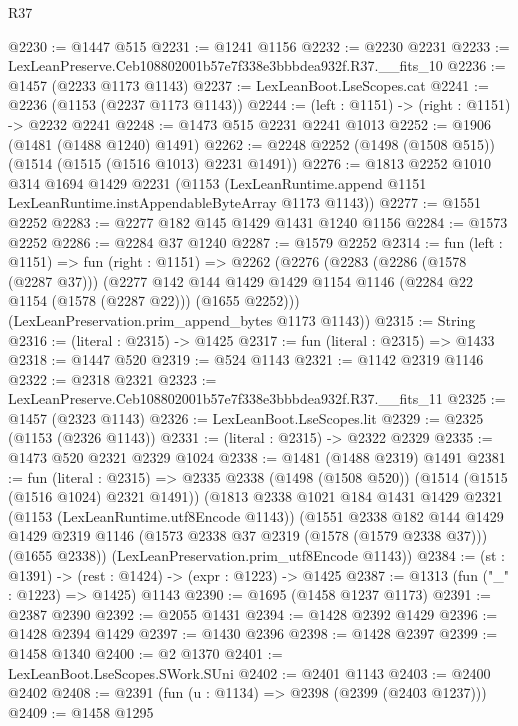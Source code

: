 \begin{lexlean}{R37}
\begin{coremodule}
@2230 := @1447 @515
@2231 := @1241 @1156
@2232 := @2230 @2231
@2233 := LexLeanPreserve.Ceb108802001b57e7f338e3bbbdea932f.R37.__fits_10
@2236 := @1457 (@2233 @1173 @1143)
@2237 := LexLeanBoot.LseScopes.cat
@2241 := @2236 (@1153 (@2237 @1173 @1143))
@2244 := (left : @1151) -> (right : @1151) -> @2232 @2241
@2248 := @1473 @515 @2231 @2241 @1013
@2252 := @1906 (@1481 (@1488 @1240) @1491)
@2262 := @2248 @2252 (@1498 (@1508 @515)) (@1514 (@1515 (@1516 @1013) @2231 @1491))
@2276 := @1813
    @2252
    @1010
    @314
    @1694
    @1429
    @2231
    (@1153 (LexLeanRuntime.append @1151 LexLeanRuntime.instAppendableByteArray @1173 @1143))
@2277 := @1551 @2252
@2283 := @2277 @182 @145 @1429 @1431 @1240 @1156
@2284 := @1573 @2252
@2286 := @2284 @37 @1240
@2287 := @1579 @2252
@2314 := fun (left : @1151) =>
  fun (right : @1151) =>
  @2262
    (@2276
      (@2283
        (@2286 (@1578 (@2287 @37)))
        (@2277
          @142
          @144
          @1429
          @1429
          @1154
          @1146
          (@2284 @22 @1154 (@1578 (@2287 @22)))
          (@1655 @2252)))
      (LexLeanPreservation.prim_append_bytes @1173 @1143))
@2315 := String
@2316 := (literal : @2315) -> @1425
@2317 := fun (literal : @2315) => @1433
@2318 := @1447 @520
@2319 := @524 @1143
@2321 := @1142 @2319 @1146
@2322 := @2318 @2321
@2323 := LexLeanPreserve.Ceb108802001b57e7f338e3bbbdea932f.R37.__fits_11
@2325 := @1457 (@2323 @1143)
@2326 := LexLeanBoot.LseScopes.lit
@2329 := @2325 (@1153 (@2326 @1143))
@2331 := (literal : @2315) -> @2322 @2329
@2335 := @1473 @520 @2321 @2329 @1024
@2338 := @1481 (@1488 @2319) @1491
@2381 := fun (literal : @2315) =>
  @2335
    @2338
    (@1498 (@1508 @520))
    (@1514 (@1515 (@1516 @1024) @2321 @1491))
    (@1813
      @2338
      @1021
      @184
      @1431
      @1429
      @2321
      (@1153 (LexLeanRuntime.utf8Encode @1143))
      (@1551
        @2338
        @182
        @144
        @1429
        @1429
        @2319
        @1146
        (@1573 @2338 @37 @2319 (@1578 (@1579 @2338 @37)))
        (@1655 @2338))
      (LexLeanPreservation.prim_utf8Encode @1143))
@2384 := (st : @1391) -> (rest : @1424) -> (expr : @1223) -> @1425
@2387 := @1313 (fun ("_" : @1223) => @1425) @1143
@2390 := @1695 (@1458 @1237 @1173)
@2391 := @2387 @2390
@2392 := @2055 @1431
@2394 := @1428 @2392 @1429
@2396 := @1428 @2394 @1429
@2397 := @1430 @2396
@2398 := @1428 @2397
@2399 := @1458 @1340
@2400 := @2 @1370
@2401 := LexLeanBoot.LseScopes.SWork.SUni
@2402 := @2401 @1143
@2403 := @2400 @2402
@2408 := @2391 (fun (u : @1134) => @2398 (@2399 (@2403 @1237)))
@2409 := @1458 @1295

\end{coremodule}
\end{lexlean}
